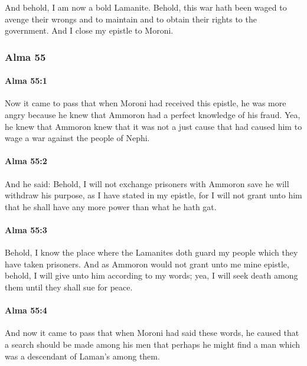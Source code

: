 			And behold, I am now a bold Lamanite.
			Behold, this war hath been waged to avenge their wrongs
			and to maintain and to obtain their rights to the government.
			And I close my epistle to Moroni.

	\subsubsection{Alma 55} %
		\label{ALMA-55}
		
		\paragraph{Alma 55:1} %
			\label{ALMA-55-1}

			Now it came to pass that when Moroni had received this epistle,
			he was more angry
			because he knew that Ammoron had a perfect knowledge of his fraud.
			Yea, he knew that Ammoron knew that it was not a just cause
			that had caused him to wage a war against the people of Nephi.

		\paragraph{Alma 55:2} %
			\label{ALMA-55-2}

			And he said:
			Behold, I will not exchange prisoners with Ammoron
			save he will withdraw his purpose, as I have stated in my epistle,
			for I will not grant unto him
			that he shall have any more power than what he hath gat.

		\paragraph{Alma 55:3} %
			\label{ALMA-55-3}

			Behold, I know the place where the Lamanites doth guard my people
			which they have taken prisoners.
			And as Ammoron would not grant unto me mine epistle,
			behold, I will give unto him according to my words;
			yea, I will seek death among them until they shall sue for peace.

		\paragraph{Alma 55:4} %
			\label{ALMA-55-4}

			And now it came to pass that when Moroni had said these words,
			he caused that a search should be made among his men
			that perhaps he might find a man
			which was a descendant of Laman's among them.

